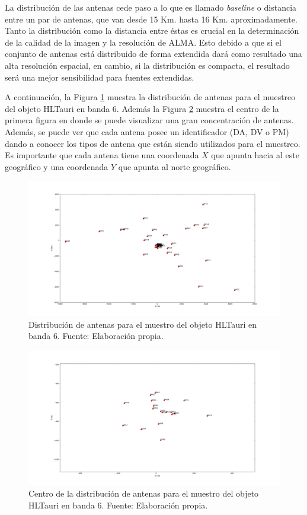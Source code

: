 La distribución de las antenas cede paso a lo que es llamado \textit{baseline} o distancia entre un par de antenas, que van desde 15 Km. hasta 16 Km. aproximadamente. Tanto la distribución como la distancia entre éstas es crucial en la determinación de la calidad de la imagen y la resolución de ALMA. Esto debido a que si el conjunto de antenas está distribuido de forma extendida dará como resultado una alta resolución espacial, en cambio, si la distribución es compacta, el resultado será una mejor sensibilidad para fuentes extendidas.

A continuación, la Figura \ref{fig:almaarray1} muestra la distribución de antenas para el muestreo del objeto HLTauri en banda 6. Además la Figura \ref{fig:almaarray2} muestra el centro de la primera figura en donde se puede visualizar una gran concentración de antenas. Además, se puede ver que cada antena posee un identificador (DA, DV o PM) dando a conocer los tipos de antena que están siendo utilizados para el muestreo. Es importante que cada antena tiene una coordenada $X$ que apunta hacia al este geográfico y una coordenada $Y$ que apunta al norte geográfico.

\begin{figure}[h!]
\centering
\includegraphics[scale=0.25]{images/HLTau_B6antennas1.png}
\caption{Distribución de antenas para el muestro del objeto HLTauri en banda 6. Fuente: Elaboración propia.}
\label{fig:almaarray1}
\end{figure}

\begin{figure}[h!]
\centering
\includegraphics[scale=0.25]{images/HLTau_B6antennasCenter.png}
\caption{Centro de la distribución de antenas para el muestro del objeto HLTauri en banda 6. Fuente: Elaboración propia.}
\label{fig:almaarray2}
\end{figure}

